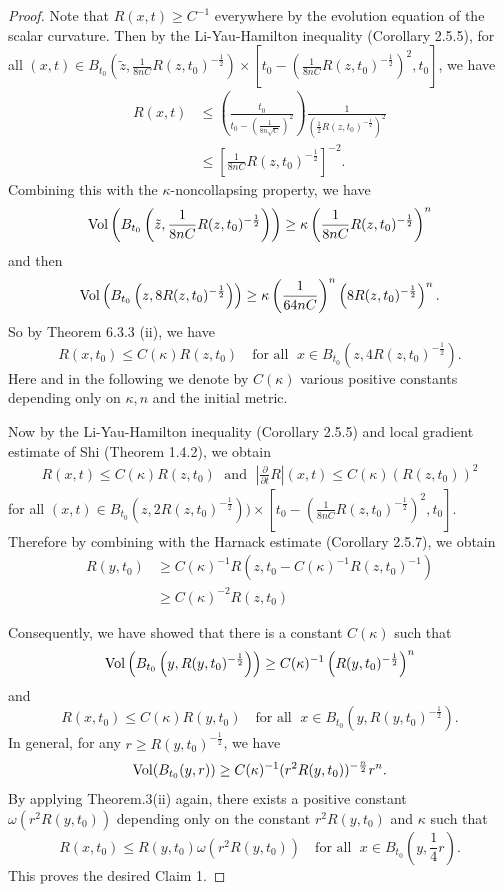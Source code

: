 \begin{proof}
Note that $R(x,t)\geqslant C^{-1}$ everywhere by the evolution
equation of the scalar curvature. Then by the Li-Yau-Hamilton
inequality (Corollary 2.5.5), for all $(x,t)\in
B_{t_{0}}(\tilde{z},\frac{1}{8nC}R(z,t_{0})^{-\frac{1}{2}})
\times[t_{0}-(\frac{1}{8nC}R(z,t_{0})^{-\frac{1}{2}})^{2},t_{0}]
$, we have
\begin{equation*}
\begin{split}
R(x,t)&  \leq \left(\frac{t_{0}}{t_{0}-\left(\frac{1}{8n\sqrt{C}}\right)^{2}}\right)
\frac{1}{\left(\frac{1}{2}R(z,t_{0})^{-\frac{1}{2}}\right)^{2}}\\
&  \leq \left[\frac{1}{8nC}R(z,t_{0})^{-\frac{1}{2}}\right]^{-2}.
\end{split}
\end{equation*}
Combining this with the $\kappa$-noncollapsing property, we have
$$
\operatorname{Vol}
\left(B_{t_{0}}\left(\tilde{z},\frac{1}{8nC}R(z,t_{0})^{-\frac{1}{2}}\right)\right)
\geq \kappa \left(\frac{1}{8nC}R(z,t_{0})^{-\frac{1}{2}}\right)^{n}
$$
and then
$$
\operatorname{Vol} \left(B_{t_{0}}\left(z,8R(z,t_{0})^{-\frac{1}{2}}\right)\right) \geq \kappa
\left(\frac{1}{64nC}\right)^{n}\left(8R(z,t_{0})^{-\frac{1}{2}}\right)^{n}.
$$
So by Theorem 6.3.3 (ii), we have
$$
R(x,t_{0})\leq C(\kappa)R(z,t_{0})\quad \text{for all }\; x\in
B_{t_{0}}\left(z,4R(z,t_{0})^{-\frac{1}{2}}\right).
$$
Here and in the following we denote by $C(\kappa)$ various
positive constants depending only on $\kappa,n$ and the initial
metric.

Now by the Li-Yau-Hamilton inequality (Corollary 2.5.5) and local
gradient estimate of Shi (Theorem 1.4.2), we obtain
\begin{align*}
R(x,t)\leq C(\kappa)R(z,t_{0})\; \text{ and }\;
\left|\frac{\partial}{\partial t}R\right|(x,t) \leq
C(\kappa)(R(z,t_{0}))^{2}
\end{align*}
for all $ (x,t)\in
B_{t_{0}}(z,2R(z,t_{0})^{-\frac{1}{2}}))\times[t_{0}-
(\frac{1}{8nC}R(z,t_{0})^{-\frac{1}{2}})^{2},t_{0}]$. Therefore by
combining with the Harnack estimate (Corollary 2.5.7), we obtain
\begin{align*}
R(y,t_{0})&  \geq C(\kappa)^{-1}R(z,t_{0}-C(\kappa)^{-1}R(z,t_{0})^{-1})\\
&  \geq C(\kappa)^{-2} R(z,t_{0})
\end{align*}

Consequently, we have showed that there is a constant $C(\kappa)$
such that
$$
\operatorname{Vol} \left(B_{t_{0}}\left(y,R(y,t_{0})^{-\frac{1}{2}}\right)\right) \geq
C(\kappa)^{-1}\left(R(y,t_{0})^{-\frac{1}{2}}\right)^{n}
$$
and
$$
R(x,t_{0})\leq C(\kappa)R(y,t_{0}) \quad \text{for all }\; x\in
B_{t_{0}}\left(y,R(y,t_{0})^{-\frac{1}{2}}\right).
$$
In general, for any $r\geq R(y,t_{0})^{-\frac{1}{2}}$, we have
$$
\operatorname{Vol} (B_{t_{0}}(y,r)) \geq
C(\kappa)^{-1}(r^{2}R(y,t_{0}))^{-\frac{n}{2}}r^{n}.
$$
By\; applying\; Theorem.3(ii)\; again,\; there\; exists\;
a\; positive\; constant $\omega(r^{2}R(y,t_{0}))$ depending only
on the constant $r^{2}R(y,t_{0})$ and $\kappa$ such that
$$
R(x,t_{0})\leq R(y,t_{0})\omega(r^{2}R(y,t_{0}))\quad \mbox{for
all }\;  x\in B_{t_{0}}\left(y,\frac{1}{4}r\right).
$$
This proves the desired Claim 1.


\end{proof}
